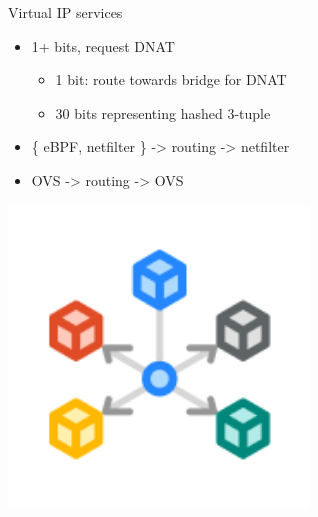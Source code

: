 \documentclass[black,white,aspectratio=169]{beamer}
\DeclareRobustCommand{\#}{\adjustbox{valign=B,totalheight=.57\baselineskip}{\oldhash}}%
\begin{document}
    \begin{frame}{Virtual IP services}
        \begin{table}
            \begin{subtable}[l]{0.7\textwidth}
        \begin{itemize}
            \item 1+ bits, request DNAT~\smallskip
            \begin{itemize}
                \item 1 bit: route towards bridge for DNAT~\smallskip
                \item 30 bits representing hashed 3-tuple~\medskip
            \end{itemize}
            \item \{ eBPF, netfilter \} -> routing -> netfilter~\medskip
            \item OVS -> routing -> OVS~\medskip
        \end{itemize}
            \end{subtable}
            \begin{subtable}[r]{0.2\textwidth}
                \includegraphics[width=0.6\textwidth]{service.png}
            \end{subtable}
        \end{table}
    \end{frame}
\end{document}
